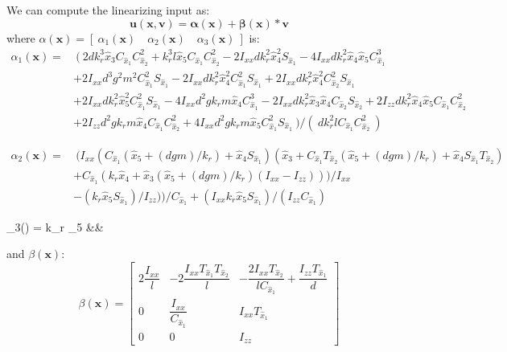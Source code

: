 \documentclass[11pt,a4paper]{scrartcl}
\begin{document}
We can compute the linearizing input as:
\begin{equation}
	\mathbf{u(x,v) = \alpha(x)+\beta(x)*v}
	\label{LinearizingControlLaw}
\end{equation}
where $ \alpha(\mathbf{x}) = [ \ \alpha_1(\mathbf{x}) \quad \alpha_2(\mathbf{x}) \quad \alpha_3(\mathbf{x}) \ ] $ is:
\begin{equation}
	\begin{split}
	\alpha_1(\mathbf{x}) = & \
	( \ 2 d k_r^3 \hat{x}_3  C_{\hat{x}_1}  C_{\hat{x}_2}^2 + k_r^3 l \hat{x}_5  C_{\hat{x}_1}  C_{\hat{x}_2}^2 - 2 I_{xx} d k_r^2 \hat{x}_4^2 S_{\hat{x}_1} 
	- 4 I_{xx} d k_r^2 \hat{x}_4 \hat{x}_5  C_{\hat{x}_1}^3 \\
	&+ 2 I_{xx} d^3 g^2 m^2  C_{\hat{x}_1}^2 S_{\hat{x}_1} - 2 I_{xx} d k_r^2 \hat{x}_4^2  C_{\hat{x}_1}^2 S_{\hat{x}_1} + 2 I_{xx} d k_r^2 \hat{x}_4^2  C_{\hat{x}_2}^2 S_{\hat{x}_1} \\
	& + 2 I_{xx} d k_r^2 \hat{x}_5^2  C_{\hat{x}_1}^2 S_{\hat{x}_1} - 4 I_{xx} d^2 g k_r m \hat{x}_4  C_{\hat{x}_1}^3 - 2 I_{xx} d k_r^2 \hat{x}_3 \hat{x}_4  C_{\hat{x}_2} S_{\hat{x}_2} + 2 I_{zz} d k_r^2 \hat{x}_4 \hat{x}_5  C_{\hat{x}_1}  C_{\hat{x}_2}^2 \\
	& + 2 I_{zz} d^2 g k_r m \hat{x}_4  C_{\hat{x}_1}  C_{\hat{x}_2}^2 + 4 I_{xx} d^2 g k_r m \hat{x}_5  C_{\hat{x}_1}^2 S_{\hat{x}_1} \ )/( \ d k_r^2 l  C_{\hat{x}_1}  C_{\hat{x}_2}^2 \ )
	\end{split}
\end{equation}

\begin{equation}
	\begin{split}
	\alpha_2(\mathbf{x}) = & \
	(I_{xx} (C_{\hat{x}_1} ( \hat{x}_5 + (d g m)/k_r) + \hat{x}_4 S_{\hat{x}_1}) (\hat{x}_3 + C_{\hat{x}_1} T_{\hat{x}_2}
	( \hat{x}_5 + (d g m)/k_r) + \hat{x}_4 S_{\hat{x}_1} T_{\hat{x}_2}) \\
	&+ C_{\hat{x}_1} (k_r \hat{x}_4 + \hat{x}_3 (\hat{x}_5 + (d g m)/k_r) (I_{xx} - I_{zz})))/I_{xx} \\
	&- (k_r \hat{x}_5 S_{\hat{x}_1})/I_{zz}))/C_{\hat{x}_1} + (I_{xx} k_r \hat{x}_5 S_{\hat{x}_1})/(I_{zz} C_{\hat{x}_1})
	\end{split}
\end{equation}

\begin{flalign}
\alpha_3() = k_r _5 &&
\end{flalign}
and $ \beta(\mathbf{x}) $:
\begin{equation}
	\beta(\mathbf{x}) = 
	\begin{bmatrix}
	2 \dfrac{I_{xx}}{l} & -2 \dfrac{I_{xx} T_{\hat{x}_1} T_{\hat{x}_2}}{l} & - \dfrac{2 I_{xx} T_{\hat{x}_2}}{l C_{\hat{x}_1}} + \dfrac{I_{zz} T_{\hat{x}_1}}{d} \\
	0 & \dfrac{I_{xx}}{C_{\hat{x}_1}} & I_{xx} T_{\hat{x}_1} \\
	0 & 0 & I_{zz}
	\end{bmatrix}
\end{equation}
\end{document}
